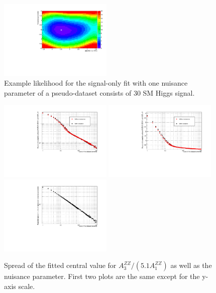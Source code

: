 \documentclass{cmspaper}
\begin{document}
\begin{figure}[htb!]
  \begin{center}
    \includegraphics[width=0.48\textwidth]{figures/A1A3NFit_LikelihoodExample_8.pdf}
    \caption{Example likelihood for the signal-only fit with one nuisance parameter of a pseudo-dataset
    consists of 30 SM Higgs signal.}
    \label{fig:A1A3NFitLikelihoodExample}
  \end{center}
\end{figure}

\begin{figure}[htb!]
  \begin{center}
    \includegraphics[width=0.48\textwidth]{figures/A1A3NFit_ComparisonOfExpectedSpread.pdf}
    \includegraphics[width=0.48\textwidth]{figures/A1A3NFit_ComparisonOfExpectedSpread_YNormal.pdf}
    \includegraphics[width=0.48\textwidth]{figures/A1A3NFit_ExpectedSpreadN.pdf}
    \caption{Spread of the fitted central value for $A_3^{ZZ}/(5.1 A_1^{ZZ})$ as well as the nuisance
    parameter.  First two plots are the same except for the y-axis scale.}
    \label{fig:A1A3NFitExpectedSpread}
  \end{center}
\end{figure}
\end{document}
